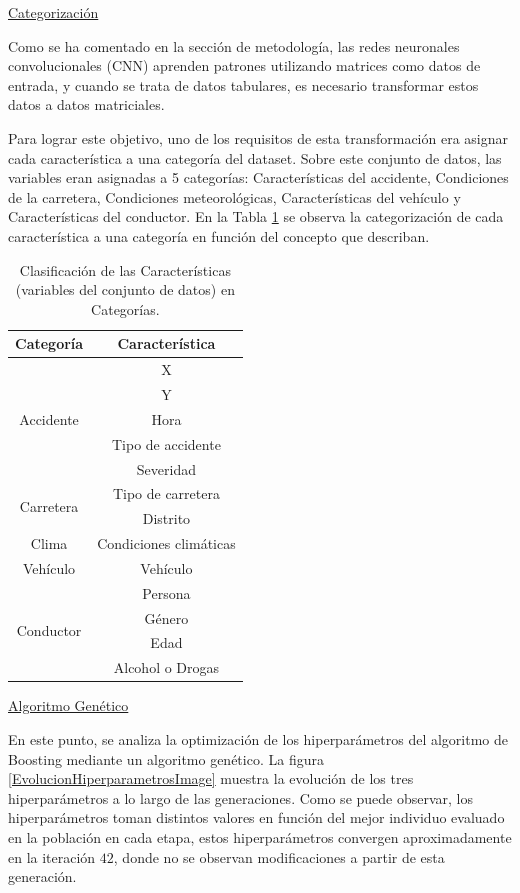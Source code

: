 \documentclass{uathesis-es}
\begin{document}
{\underline{Categorización}

Como se ha comentado en la sección de metodología, las redes neuronales convolucionales (CNN) aprenden patrones utilizando matrices como datos de entrada, y cuando se trata de datos tabulares, es necesario transformar estos datos a datos matriciales.

Para lograr este objetivo, uno de los requisitos de esta transformación era asignar cada característica a una categoría del dataset. Sobre este conjunto de datos, las variables eran asignadas a 5 categorías: Características del accidente, Condiciones de la carretera, Condiciones meteorológicas, Características del vehículo y Características del conductor. En la Tabla \ref{JC} se observa la categorización de cada característica a una categoría en función del concepto que describan.

\begin{table}[H]
	\centering

		\begin{tabular}{ |c|c| }
			\hline
			\textbf{Categoría} & \textbf{Característica} \\
			\hline
			\hline
			\multirow{5}{*}{Accidente} & X \\
									   & Y \\
									   & Hora \\
									   & Tipo de accidente \\
									   & Severidad \\
			\hline
			\hline
			\multirow{2}{*}{Carretera} & Tipo de carretera \\
									   & Distrito \\
			\hline
			\hline
			Clima & Condiciones climáticas \\
			\hline
			\hline
			Vehículo & Vehículo \\
			\hline
			\hline
			\multirow{4}{*}{Conductor} & Persona \\
									   & Género \\
									   & Edad \\
									   & Alcohol o Drogas \\
			\hline
			\hline
		\end{tabular}

	\caption{Clasificación de las Características (variables del conjunto de datos) en Categorías.}
	\label{JC}
\end{table}


\underline{Algoritmo Genético}

En este punto, se analiza la optimización de los hiperparámetros del algoritmo de Boosting mediante un algoritmo genético. La figura \ref{EvolucionHiperparametrosImage} muestra la evolución de  los tres hiperparámetros a lo largo de las generaciones. Como se puede observar, los hiperparámetros toman distintos valores en función del mejor individuo evaluado en la población en cada etapa, estos hiperparámetros convergen aproximadamente en la iteración $42$, donde no se observan modificaciones a partir de esta generación.

}
\end{document}
